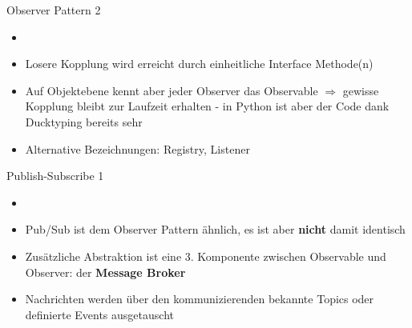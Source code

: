 \begin{frame}{Observer Pattern 2}
        \begin{itemize}
        \setlength{\itemindent}{1.1in}
        \item [\textbf{Observer Pattern}]
    \end{itemize}

    \begin{itemize}
        \item Losere Kopplung wird erreicht durch einheitliche Interface Methode(n)
        \item Auf Objektebene kennt aber jeder Observer das Observable   $\Rightarrow$ gewisse Kopplung bleibt zur Laufzeit erhalten - in Python ist aber der Code dank Ducktyping bereits sehr 
        \item Alternative Bezeichnungen: Registry, Listener
    \end{itemize}
\end{frame}

\begin{frame}{Publish-Subscribe 1} %
      \begin{itemize}
        \setlength{\itemindent}{1.5in}
        \item [\textbf{Publish/Subscribe Pattern}]
    \end{itemize}

    \begin{itemize}
        \item Pub/Sub ist dem Observer Pattern ähnlich, es ist aber \textbf{nicht} damit identisch
        \item Zusätzliche Abstraktion ist eine 3. Komponente zwischen Observable und Observer: der  \textbf{Message Broker}
        \item Nachrichten werden über den kommunizierenden bekannte Topics oder definierte Events ausgetauscht
    \end{itemize}

\end{frame}


